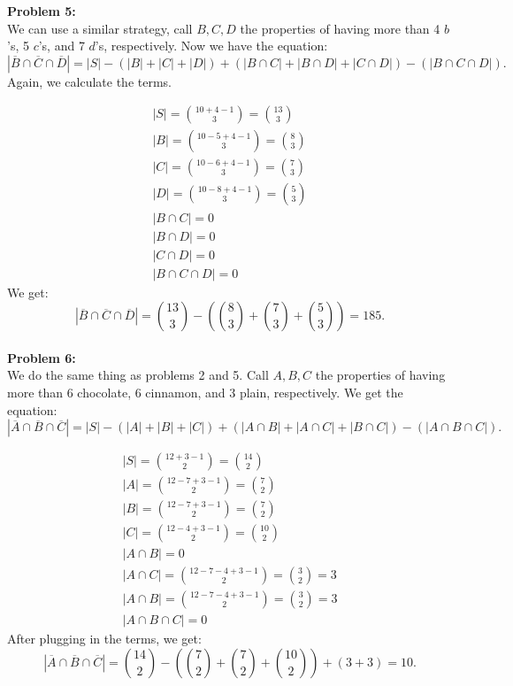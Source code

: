 \documentclass[12pt]{article}
\begin{document}
\noindent
\textbf{Problem 5:}\\

\noindent
We can use a similar strategy, call $B, C, D$ the properties of having more than 4 $b$'s, 5 $c$'s, and 7 $d$'s, 
respectively. Now we have the equation:
\[
	|\overline{B} \cap \overline{C} \cap \overline{D}| = 
	|S| - (|B|+|C|+|D|) + (|B \cap C| + |B \cap D| + |C \cap D|) - (|B \cap C \cap D|)
.\] 
Again, we calculate the terms.

\begin{align}
	|S| = \binom{10+4-1}{3} = \binom{13}{3}\\
	|B| = \binom{10-5+4-1}{3} = \binom{8}{3}\\
	|C| = \binom{10-6+4-1}{3} = \binom{7}{3}\\
	|D| = \binom{10-8+4-1}{3} = \binom{5}{3}\\
	|B \cap C| = 0\\
	|B \cap D| = 0\\
	|C \cap D| = 0\\
	|B \cap C \cap D| = 0
\end{align}
We get:
\[
	|\overline{B} \cap \overline{C} \cap \overline{D}| = 
	\binom{13}{3}-(\binom{8}{3}+\binom{7}{3}+\binom{5}{3}) = 185	  
.\]\\

\noindent
\textbf{Problem 6:}\\

\noindent
We do the same thing as problems 2 and 5. Call $A,B,C$ the properties of having more than 
6 chocolate, 6 cinnamon, and 3 plain, respectively. We get the equation:
 \[
	|\overline{A} \cap \overline{B} \cap \overline{C}| = 
	|S| - (|A|+|B|+|C|) + (|A \cap B| + |A \cap C| + |B \cap C|) - (|A \cap B \cap C|)
 .\] 

\begin{align}
	|S| = \binom{12+3-1}{2} = \binom{14}{2}\\
	|A| = \binom{12-7+3-1}{2} = \binom{7}{2}\\
	|B| = \binom{12-7+3-1}{2} = \binom{7}{2}\\
	|C| = \binom{12-4+3-1}{2} = \binom{10}{2}\\
	|A \cap B| = 0 \\
	|A \cap C| = \binom{12-7-4+3-1}{2} = \binom{3}{2} = 3\\
	|A \cap B| = \binom{12-7-4+3-1}{2} = \binom{3}{2} = 3\\
 	|A \cap B \cap C| = 0
\end{align}
After plugging in the terms, we get:
\[
|\overline{A} \cap \overline{B} \cap \overline{C}| = 
\binom{14}{2} - (\binom{7}{2} + \binom{7}{2} + \binom{10}{2}) + (3 + 3) = 10
.\]\\
 
\end{document}
